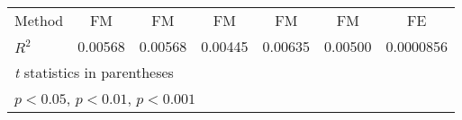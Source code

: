 {\begin{tabular}{l*{6}{c}}
Method          &       FM         &       FM         &       FM         &       FM         &       FM         &       FE         \\
$ R^2$          &  0.00568         &  0.00568         &  0.00445         &  0.00635         &  0.00500         &0.0000856         \\
\hline\hline
\multicolumn{7}{l}{\footnotesize \textit{t} statistics in parentheses}\\
\multicolumn{7}{l}{\footnotesize \sym{*} \(p<0.05\), \sym{**} \(p<0.01\), \sym{***} \(p<0.001\)}\\
\end{tabular}
}
